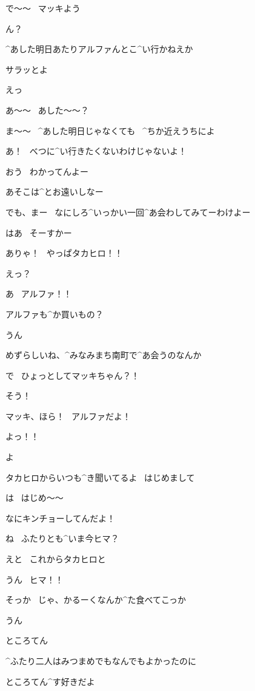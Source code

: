 \Takahiro で〜〜
\ マッキよう

\Makki ん？

\Takahiro ^{あした}{明日}あたりアルファんとこ^{い}{行}かねえか

\Takahiro サラッとよ

\Makki えっ

\Makki あ〜〜
\ あした〜〜？

\page[28]
\Takahiro ま〜〜
\ ^{あした}{明日}じゃなくても
\ ^{ちか}{近}えうちによ

\Makki あ！
\ べつに^{い}{行}きたくないわけじゃないよ！

\Takahiro おう
\ わかってんよー

\Takahiro あそこは^{とお}{遠}いしなー

\page[29]
\Takahiro でも、まー
\ なにしろ^{いっかい}{一回}^{あ}{会}わしてみてーわけよー

\Makki はあ
\ そーすかー

\page[30]
\Alpha ありゃ！
\ やっぱタカヒロ！！

\Takahiro えっ？

\Takahiro あ
\ アルファ！！

\page[31]
\Takahiro アルファも^{か}{買}いもの？

\Alpha うん

\Alpha めずらしいね、^{みなみまち}{南町}で^{あ}{会}うのなんか

\Alpha で
\ ひょっとしてマッキちゃん？！

\Takahiro そう！

\Takahiro マッキ、ほら！
\ アルファだよ！

\page[32]
\Makki よっ！！

\Alpha よ

\page[33]
\Alpha タカヒロからいつも^{き}{聞}いてるよ
\ はじめまして

\Makki は
\ はじめ〜〜

\Takahiro なにキンチョーしてんだよ！

\Alpha ね
\ ふたりとも^{いま}{今}ヒマ？

\Makki えと
\ これからタカヒロと

\Takahiro うん
\ ヒマ！！

\Alpha そっか
\ じゃ、かるーくなんか^{た}{食}べてこっか

\Takahiro うん

\page[34]
\Sign ところてん

\Alpha ^{ふたり}{二人}はみつまめでもなんでもよかったのに

\Takahiro ところてん^{す}{好}きだよ

